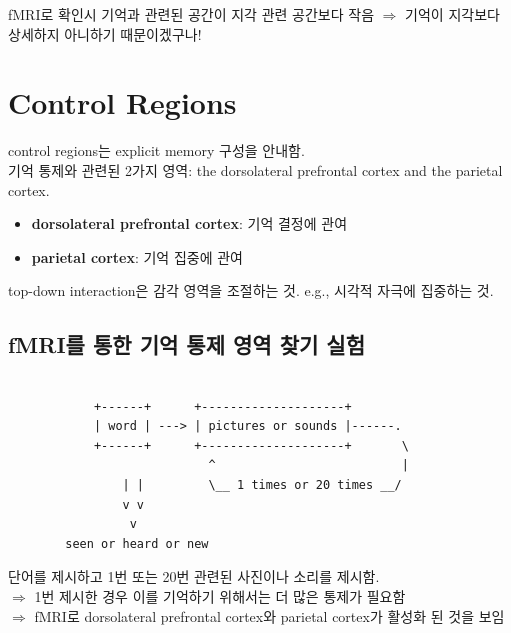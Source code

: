 \documentclass[../note.tex]{subfiles}
\begin{document}
fMRI로 확인시 기억과 관련된 공간이 지각 관련 공간보다 작음 $\Longrightarrow$ 기억이 지각보다 상세하지 아니하기 때문이겠구나!


\section{Control Regions}
control regions는 explicit memory 구성을 안내함.\\
기억 통제와 관련된 2가지 영역: the dorsolateral prefrontal cortex and the parietal cortex.
\begin{itemize}
  \item \textbf{dorsolateral prefrontal cortex}: 기억 결정에 관여
  \item \textbf{parietal cortex}: 기억 집중에 관여
\end{itemize}

\begin{definition}
  top-down interaction은 감각 영역을 조절하는 것. e.g., 시각적 자극에 집중하는 것.
\end{definition}

\subsection{fMRI를 통한 기억 통제 영역 찾기 실험}
\begin{center}
  \small
  \begin{spacing}{0.8}
    \begin{BVerbatim}

            +------+      +--------------------+
            | word | ---> | pictures or sounds |------.
            +------+      +--------------------+       \
                            ^                          |
                | |         \__ 1 times or 20 times __/
                v v
                 v
        seen or heard or new

    \end{BVerbatim}
  \end{spacing}
\end{center}
단어를 제시하고 1번 또는 20번 관련된 사진이나 소리를 제시함.\\
$\Rightarrow$ 1번 제시한 경우 이를 기억하기 위해서는 더 많은 통제가 필요함\\
$\Rightarrow$ fMRI로 dorsolateral prefrontal cortex와 parietal cortex가 활성화 된 것을 보임
\end{document}
